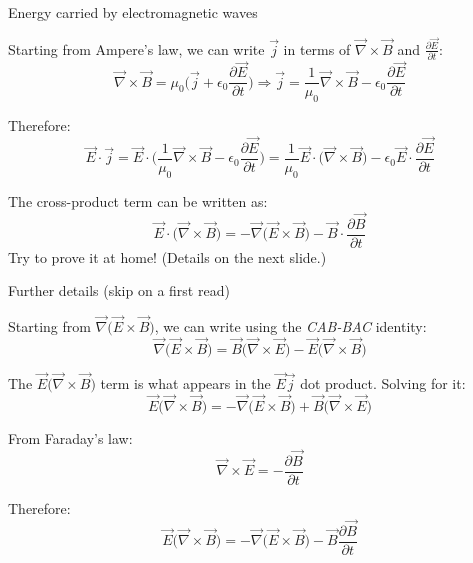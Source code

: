 %
%
%
%

\begin{frame}{Energy carried by electromagnetic waves}

Starting from Ampere's law, we can write $\vec{j}$ in terms of
$\vec{\nabla} \times \vec{B}$ and $\frac{\partial \vec{E}}{\partial t}$:
\begin{equation*}
  \vec{\nabla} \times \vec{B} = \mu_0 \Big( \vec{j} + \epsilon_0 \frac{\partial \vec{E}}{\partial t} \Big) \Rightarrow
  \vec{j} = \frac{1}{\mu_0}  \vec{\nabla} \times \vec{B} - \epsilon_0 \frac{\partial \vec{E}}{\partial t}
\end{equation*}

Therefore:
\begin{equation*}
 \vec{E} \cdot \vec{j} =
   \vec{E} \cdot \Big( \frac{1}{\mu_0}  \vec{\nabla} \times \vec{B} - \epsilon_0 \frac{\partial \vec{E}}{\partial t} \Big) =
   \frac{1}{\mu_0}  \vec{E} \cdot \Big( \vec{\nabla} \times \vec{B} \Big) - \epsilon_0 \vec{E} \cdot \frac{\partial \vec{E}}{\partial t}
\end{equation*}

The cross-product term can be written as:
\begin{equation*}
 \vec{E} \cdot \Big( \vec{\nabla} \times \vec{B} \Big) =
 - \vec{\nabla} \Big( \vec{E} \times \vec{B} \Big) - \vec{B} \cdot \frac{\partial \vec{B}}{\partial t}
\end{equation*}
Try to prove it at home! (Details on the next slide.)

\end{frame}

%
%
%
%

\begin{frame}{Further details (skip on a first read)}

Starting from $\vec{\nabla} \Big( \vec{E} \times \vec{B} \Big)$, we can write using the {\em CAB-BAC} identity:
\begin{equation*}
 \vec{\nabla} \Big( \vec{E} \times \vec{B} \Big) = \vec{B} \Big( \vec{\nabla} \times \vec{E} \Big) - \vec{E}  \Big( \vec{\nabla} \times \vec{B} \Big)
\end{equation*}

The $\vec{E}  \Big( \vec{\nabla} \times \vec{B} \Big)$ term is what appears in the $\vec{E} \vec{j}$ dot product. Solving for it:
\begin{equation*}
 \vec{E}  \Big( \vec{\nabla} \times \vec{B} \Big) = - \vec{\nabla} \Big( \vec{E} \times \vec{B} \Big) + \vec{B} \Big( \vec{\nabla} \times \vec{E} \Big)
\end{equation*}

From Faraday's law:
\begin{equation*}
  \vec{\nabla} \times \vec{E} = - \frac{\partial \vec{B}}{\partial t}
\end{equation*}

Therefore:
\begin{equation*}
 \vec{E}  \Big( \vec{\nabla} \times \vec{B} \Big) = - \vec{\nabla} \Big( \vec{E} \times \vec{B} \Big) - \vec{B} \frac{\partial \vec{B}}{\partial t}
\end{equation*}

\end{frame}

